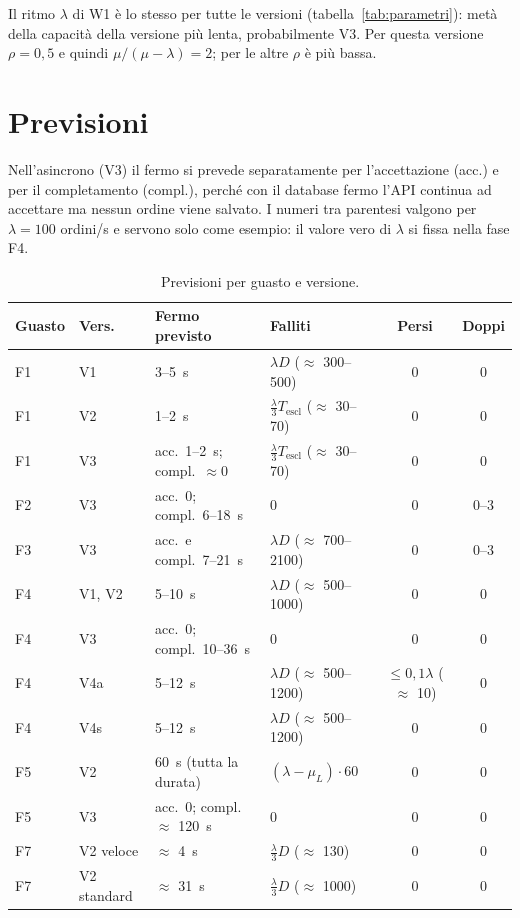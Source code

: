Il ritmo $\lambda$ di W1 è lo stesso per tutte le versioni (tabella~\ref{tab:parametri}): metà della capacità della versione più lenta, probabilmente V3. Per questa versione $\rho = 0{,}5$ e quindi $\mu / (\mu - \lambda) = 2$; per le altre $\rho$ è più bassa.

\section{Previsioni}

Nell'asincrono (V3) il fermo si prevede separatamente per l'accettazione (acc.) e per il completamento (compl.), perché con il database fermo l'API continua ad accettare ma nessun ordine viene salvato. I numeri tra parentesi valgono per $\lambda = 100$ ordini/s e servono solo come esempio: il valore vero di $\lambda$ si fissa nella fase F4.

\begin{table}[htbp]
\centering
\caption{Previsioni per guasto e versione.}
\label{tab:previsioni}
\small
\begin{tabularx}{\linewidth}{@{}llLLcc@{}}
\toprule
\textbf{Guasto} & \textbf{Vers.} & \textbf{Fermo previsto} & \textbf{Falliti} & \textbf{Persi} & \textbf{Doppi} \\
\midrule
F1 & V1 & 3--5~s & $\lambda D$ ($\approx$ 300--500) & 0 & 0 \\
F1 & V2 & 1--2~s & $\frac{\lambda}{3} T_{\text{escl}}$ ($\approx$ 30--70) & 0 & 0 \\
F1 & V3 & acc.\ 1--2~s; compl.\ $\approx 0$ & $\frac{\lambda}{3} T_{\text{escl}}$ ($\approx$ 30--70) & 0 & 0 \\
F2 & V3 & acc.\ 0; compl.\ 6--18~s & 0 & 0 & 0--3 \\
F3 & V3 & acc.\ e compl.\ 7--21~s & $\lambda D$ ($\approx$ 700--2100) & 0 & 0--3 \\
F4 & V1, V2 & 5--10~s & $\lambda D$ ($\approx$ 500--1000) & 0 & 0 \\
F4 & V3 & acc.\ 0; compl.\ 10--36~s & 0 & 0 & 0 \\
F4 & V4a & 5--12~s & $\lambda D$ ($\approx$ 500--1200) & $\le 0{,}1\lambda$ ($\approx$ 10) & 0 \\
F4 & V4s & 5--12~s & $\lambda D$ ($\approx$ 500--1200) & 0 & 0 \\
F5 & V2 & 60~s (tutta la durata) & $(\lambda - \mu_L) \cdot 60$ & 0 & 0 \\
F5 & V3 & acc.\ 0; compl.\ $\approx$ 120~s & 0 & 0 & 0 \\
F7 & V2 veloce & $\approx$ 4~s & $\frac{\lambda}{3} D$ ($\approx$ 130) & 0 & 0 \\
F7 & V2 standard & $\approx$ 31~s & $\frac{\lambda}{3} D$ ($\approx$ 1000) & 0 & 0 \\
\bottomrule
\end{tabularx}
\end{table}

